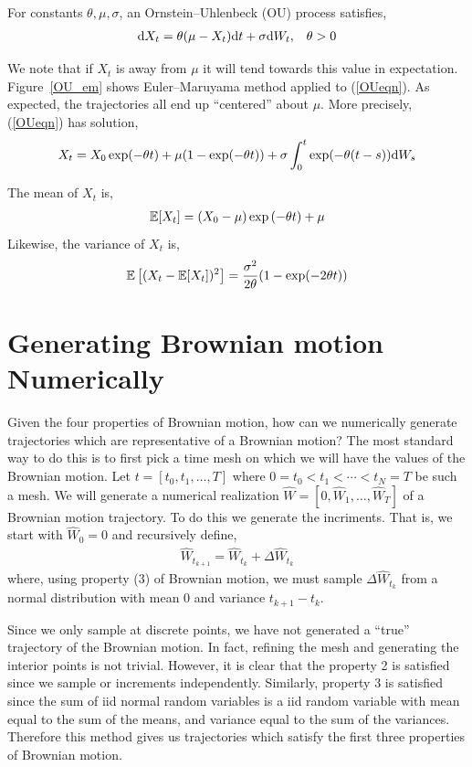 \documentclass[12pt]{article}
\begin{document}
For constants \( \theta, \mu, \sigma \), an Ornstein--Uhlenbeck (OU) process satisfies,
\begin{align}
    \mathrm{d} X_t = \theta(\mu-X_t) \mathrm{d} t + \sigma \mathrm{d} W_t, && \theta > 0 \label{OUeqn}
\end{align}

We note that if \( X_t \) is away from \( \mu \) it will tend towards this value in expectation. Figure~\ref{OU_em} shows Euler--Maruyama method applied to (\ref{OUeqn}). As expected, the trajectories all end up ``centered'' about \( \mu \). More precisely, (\ref{OUeqn}) has solution,
\begin{align*}
    X_t = X_0 \exp(-\theta t) + \mu(1-\exp(-\theta t)) + \sigma \int_0^t \exp(-\theta(t-s))\mathrm{d} W_s
\end{align*}

The mean of \( X_t \) is,
\begin{align*}
    \mathbb{E}[X_t] = (X_0 - \mu)\exp \left( -\theta t \right)+ \mu
\end{align*}
Likewise, the variance of \( X_t \) is,
\begin{align*}
    \mathbb{E}\left[(X_t-\mathbb{E}[X_t])^2\right] = \dfrac{\sigma^2}{2\theta}(1-\exp(-2\theta t))
\end{align*}

\section{Generating Brownian motion Numerically} \label{brownian_motion}

Given the four properties of Brownian motion, how can we numerically generate trajectories which are representative of a Brownian motion? The most standard way to do this is to first pick a time mesh on which we will have the values of the Brownian motion. Let \( t = [t_0, t_1, \ldots, T] \) where \( 0 = t_0 < t_1 < \cdots < t_N = T \) be such a mesh. We will generate a numerical realization \( \hat{W} = [0, \hat{W}_1, \ldots, \hat{W}_T] \) of a Brownian motion trajectory. To do this we generate the incriments. That is, we start with \( \hat{W}_0 = 0 \) and recursively define,
\begin{align*}
    \hat{W}_{t_{k+1}} = \hat{W}_{t_k} + \Delta \hat{W}_{t_k}
\end{align*}
where, using property (3) of Brownian motion, we must sample \( \Delta \hat{W}_{t_k} \) from a normal distribution with mean 0 and variance \( t_{k+1} -t_{k} \).

Since we only sample at discrete points, we have not generated a ``true'' trajectory of the Brownian motion. In fact, refining the mesh and generating the interior points is not trivial. However, it is clear that the property 2 is satisfied since we sample or increments independently. Similarly, property 3 is satisfied since the sum of iid normal random variables is a iid random variable with mean equal to the sum of the means, and variance equal to the sum of the variances. Therefore this method gives us trajectories which satisfy the first three properties of Brownian motion.
\end{document}
